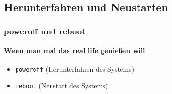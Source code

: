 \documentclass[12pt,utf8]{beamer}
\begin{document}

\subsection{Herunterfahren und Neustarten}
\begin{frame}
\frametitle{poweroff und reboot}
\framesubtitle{Wenn man mal das real life genießen will}
\begin{itemize}
	\item \texttt{poweroff} (Herunterfahren des Systems)
	\item \texttt{reboot} (Neustart des Systems)
\end{itemize}
\end{frame}

\end{document}
